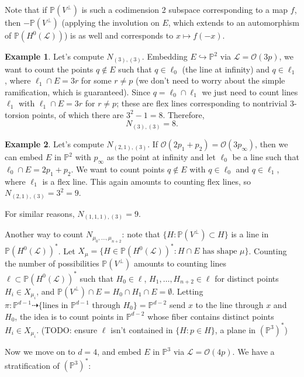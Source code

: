 \documentclass[11pt]{article}           %
\renewcommand{\P}{\mathbb P}
\theoremstyle{definition}
\newtheorem{eg}{Example}[section]
\begin{document}
Note that if $\P(V^{\perp})$ is such a codimension 2 subspace corresponding to a map $f$, then $-\P(V^{\perp})$ (applying the involution on $E$, which extends to an automorphism of $\P(H^0(\mathcal L))$) is as well and corresponds to $x\mapsto f(-x)$.

\begin{eg}
  Let's compute $N_{(3),(3)}$. Embedding $E\hookrightarrow\P^2$ via $\mathcal L=\mathcal O(3p)$, we want to count the points $q\notin E$ such that
  $q\in\ell_0$ (the line at infinity) and $q\in\ell_1$, where $\ell_1\cap E=3r$ for some $r\neq p$ (we don't need to worry about the simple ramification, which
  is guaranteed). Since $q=\ell_0\cap\ell_1$ we just need to count lines $\ell_1$ with $\ell_1\cap E=3r$ for $r\neq p$; these are flex lines corresponding to nontrivial 3-torsion points, of which there are $3^2-1=8$. Therefore,
  \[
  N_{(3),(3)}=8.
  \]
\end{eg}
\begin{eg}
  Let's compute $N_{(2,1),(3)}$. If $\mathcal O(2p_1+p_2)=\mathcal O(3p_{\infty})$, then we can embed $E$ in $\P^2$ with $p_{\infty}$ as the point at infinity
  and let $\ell_0$ be a line such that $\ell_0\cap E=2p_1+p_2$. We want to count points $q\notin E$ with $q\in \ell_0$ and $q\in \ell_1$, where $\ell_1$ is a flex line. This again amounts to counting flex lines, so $N_{(2,1),(3)}=3^2=9$.

  For similar reasons, $N_{(1,1,1),(3)}=9$.
\end{eg}

Another way to count $N_{\mu_0,\dots,\mu_{n+2}}$: note that $\{H:\P(V^{\perp})\subset H\}$ is a line in $\P(H^0(\mathcal L))^*$.
Let $X_{\mu}=\{H\in\P(H^0(\mathcal L))^*:H\cap E\text{ has shape }\mu\}$.
Counting the number of possibilities $\P(V^{\perp})$ amounts to counting lines $\ell\subset\P(H^0(\mathcal L))^*$ such that $H_0\in\ell$, $H_1,\dots,H_{n+2}\in\ell$ for distinct points $H_i\in X_{\mu_i}$, and $\P(V^{\perp})\cap E=H_0\cap H_1\cap E=\emptyset$.
Letting $\pi:\P^{d-1}\dashrightarrow \{\text{lines in $\P^{d-1}$ through $H_0$}\}=\P^{d-2}$ send $x$ to the line through $x$ and $H_0$, the idea is to count points in $\P^{d-2}$ whose fiber contains distinct points $H_i\in X_{\mu_i}$. (TODO: ensure $\ell$ isn't contained in $\{H:p\in H\}$, a plane in $(\P^3)^*$)

Now we move on to $d=4$, and embed $E$ in $\P^3$ via
$\mathcal L=\mathcal O(4p)$. We have a stratification of $(\P^3)^*$:

\end{document}
